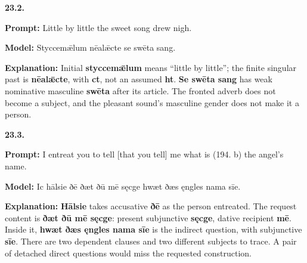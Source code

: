 \par\begin{minipage}{\linewidth}\raggedright
\textbf{23.2.}

\textbf{Prompt:} Little by little the sweet song drew nigh.

\textbf{Model:} Styccemǣlum nēalǣcte se swēta sang.

\textbf{Explanation:} Initial \textbf{styccemǣlum} means “little by little”; the finite singular past is \textbf{nēalǣcte}, with \textbf{ct}, not an assumed \textbf{ht}. \textbf{Se swēta sang} has weak nominative masculine \textbf{swēta} after its article. The fronted adverb does not become a subject, and the pleasant sound’s masculine gender does not make it a person.

\end{minipage}\par\addvspace{4pt}

\par\begin{minipage}{\linewidth}\raggedright
\textbf{23.3.}

\textbf{Prompt:} I entreat you to tell [that you tell] me what is (194. b) the angel’s name.

\textbf{Model:} Ic hālsie ðē ðæt ðū mē sęcge hwæt ðæs ęngles nama sīe.

\textbf{Explanation:} \textbf{Hālsie} takes accusative \textbf{ðē} as the person entreated. The request content is \textbf{ðæt ðū mē sęcge}: present subjunctive \textbf{sęcge}, dative recipient \textbf{mē}. Inside it, \textbf{hwæt ðæs ęngles nama sīe} is the indirect question, with subjunctive \textbf{sīe}. There are two dependent clauses and two different subjects to trace. A pair of detached direct questions would miss the requested construction.

\end{minipage}\par\addvspace{4pt}

